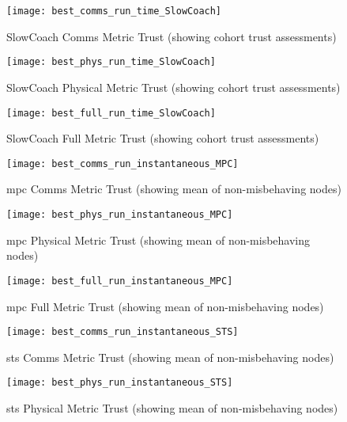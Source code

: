 \begin{figure}[h]
  \centering
  \texttt{[image: best\_comms\_run\_time\_SlowCoach]}
  \caption{SlowCoach Comms Metric Trust (showing cohort trust assessments)}
  \label{fig:comms_time_slowcoach}
\end{figure}

\begin{figure}[h]
  \centering
  \texttt{[image: best\_phys\_run\_time\_SlowCoach]}
  \caption{SlowCoach Physical Metric Trust (showing cohort trust assessments)}
  \label{fig:phys_time_slowcoach}
\end{figure}

\begin{figure}[h]
  \centering
  \texttt{[image: best\_full\_run\_time\_SlowCoach]}
  \caption{SlowCoach Full Metric Trust (showing cohort trust assessments)}
  \label{fig:full_time_slowcoach}
\end{figure}


\begin{figure}[h]
  \centering
  \texttt{[image: best\_comms\_run\_instantaneous\_MPC]}
  \caption{\gls{mpc} Comms Metric Trust (showing mean of non-misbehaving nodes)}
  \label{fig:comms_instantaneous_mpc}
\end{figure}

\begin{figure}[h]
  \centering
  \texttt{[image: best\_phys\_run\_instantaneous\_MPC]}
  \caption{\gls{mpc} Physical Metric Trust (showing mean of non-misbehaving nodes)}
  \label{fig:phys_instantaneous_mpc}
\end{figure}

\begin{figure}[h]
  \centering
  \texttt{[image: best\_full\_run\_instantaneous\_MPC]}
  \caption{\gls{mpc} Full Metric Trust (showing mean of non-misbehaving nodes)}
  \label{fig:full_instantaneous_mpc}
\end{figure}


\begin{figure}[h]
  \centering
  \texttt{[image: best\_comms\_run\_instantaneous\_STS]}
  \caption{\gls{sts} Comms Metric Trust (showing mean of non-misbehaving nodes)}
  \label{fig:comms_instantaneous_sts}
\end{figure}

\begin{figure}[h]
  \centering
  \texttt{[image: best\_phys\_run\_instantaneous\_STS]}
  \caption{\gls{sts} Physical Metric Trust (showing mean of non-misbehaving nodes)}
  \label{fig:phys_instantaneous_sts}
\end{figure}


